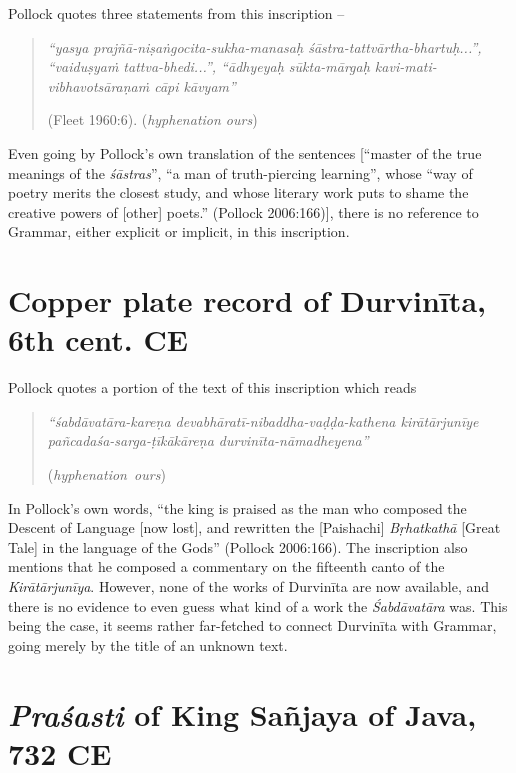 Pollock quotes three statements from this inscription -- 
\begin{quote}
{{\sl ``yasya prajñā-niṣaṅgocita-sukha-manasaḥ śāstra-tattvārtha-bhartuḥ...'', ``vai\-duṣyaṁ tattva-bhedi...'', ``ādhyeyaḥ sūkta-mārgaḥ kavi-mati-vibhavotsāraṇaṁ cāpi kāvyam''}}

\hfill (Fleet 1960:6). ({\sl hyphenation ours}) 
\end{quote}

Even going by Pollock's own translation of the sentences [``master of the true meanings of the {\sl śāstras}'', ``a man of truth-piercing learning'', whose ``way of poetry merits the closest study, and whose literary work puts to shame the creative powers of [other] poets.'' (Pollock 2006:166)], there is no reference to Grammar, either explicit or implicit, in this inscription.

\section{Copper plate record of Durvinīta, 6th cent. CE}\label{chap3-sec3}

Pollock quotes a portion of the text of this inscription which reads 
\begin{quote}
{{\sl ``śabdāvatāra-kareṇa devabhāratī-nibaddha-vaḍḍa-kathena kirātārjunīye pañ\-ca\-daśa-sarga-ṭīkākāreṇa durvinīta-nāmadheyena''}} 

\hfill \hbox{({\sl hyphenation ours})}
\end{quote}

In Pollock's own words, ``the king is praised as the man who composed the Descent of Language [now lost], and rewritten the [Paishachi] {\sl Bṛhatkathā} [Great Tale] in the language of the Gods'' (Pollock 2006:166). The inscription also mentions that he composed a commentary on the fifteenth canto of the {\sl Kirātārjunīya}. However, none of the works of Durvinīta are now available, and there is no evidence to even guess what kind of a work the {\sl Śabdāvatāra} was. This being the case, it seems rather far-fetched to connect Durvinīta with Grammar, going merely by the title of an unknown text. 

\section{{\sl\bfseries Praśasti} of King Sañjaya of Java, 732 CE}\label{chap3-sec4}

